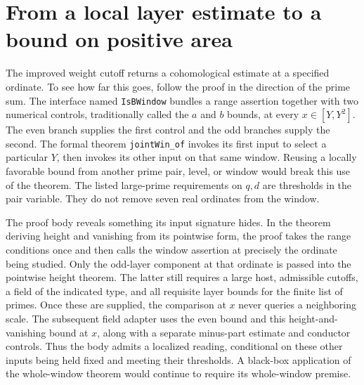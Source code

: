 \documentclass[12pt,letterpaper]{article}
\begin{document}
\section{From a local layer estimate to a bound on positive area}
\label{sec:band-consume}
The improved weight cutoff returns a cohomological estimate at a specified ordinate. To see how far this goes, follow the proof in the direction of the prime sum. The interface named \texttt{IsBWindow} bundles a range assertion together with two numerical controls, traditionally called the \(a\) and \(b\) bounds, at every \(x\in[Y,Y^2]\). The even branch supplies the first control and the odd branches supply the second. The formal theorem \texttt{jointWin\_of} invokes its first input to select a particular \(Y\), then invokes its other input on that same window. Reusing a locally favorable bound from another prime pair, level, or window would break this use of the theorem. The listed large-prime requirements on \(q,d\) are thresholds in the pair variable. They do not remove seven real ordinates from the window.  

The proof body reveals something its input signature hides. In the theorem deriving height and vanishing from its pointwise form, the proof takes the range conditions once and then calls the window assertion at precisely the ordinate being studied. Only the odd-layer component at that ordinate is passed into the pointwise height theorem. The latter still requires a large host, admissible cutoffs, a field of the indicated type, and all requisite layer bounds for the finite list of primes. Once these are supplied, the comparison at \(x\) never queries a neighboring scale. The subsequent field adapter uses the even bound and this height-and-vanishing bound at \(x\), along with a separate minus-part estimate and conductor controls. Thus the body admits a localized reading, conditional on these other inputs being held fixed and meeting their thresholds. A black-box application of the whole-window theorem would continue to require its whole-window premise.   
\end{document}
